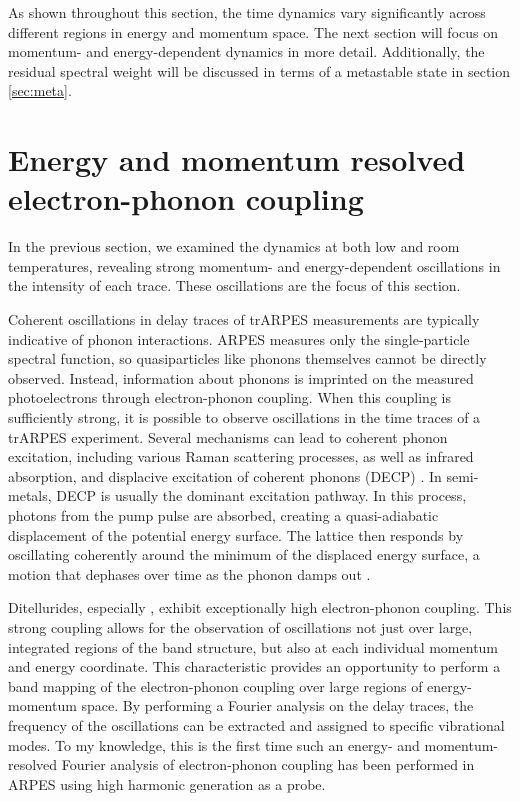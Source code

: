 As shown throughout this section, the time dynamics vary significantly across different regions in energy and momentum space.
The next section will focus on momentum- and energy-dependent dynamics in more detail.
Additionally, the residual spectral weight will be discussed in terms of a metastable state in section \ref{sec:meta}.

\section{Energy and momentum resolved electron-phonon coupling}
\label{sec:phonon_osc}

In the previous section, we examined the dynamics at both low and room temperatures, revealing strong momentum- and energy-dependent oscillations in the intensity of each trace.
These oscillations are the focus of this section.

Coherent oscillations in delay traces of trARPES measurements are typically indicative of phonon interactions.
ARPES measures only the single-particle spectral function, so quasiparticles like phonons themselves cannot be directly observed.
Instead, information about phonons is imprinted on the measured photoelectrons through electron-phonon coupling.
When this coupling is sufficiently strong, it is possible to observe oscillations in the time traces of a trARPES experiment.
Several mechanisms can lead to coherent phonon excitation, including various Raman scattering processes, as well as infrared absorption, and displacive excitation of coherent phonons (DECP) \cite{zeiger_theory_1992, kuznetsov_theory_1994, giret_entropy_2011, juraschek_sum-frequency_2018, lakehal_microscopic_2019, caruso_quantum_2023, emeis_coherent_2024}.
In semi-metals, DECP is usually the dominant excitation pathway.
In this process, photons from the pump pulse are absorbed, creating a quasi-adiabatic displacement of the potential energy surface.
The lattice then responds by oscillating coherently around the minimum of the displaced energy surface, a motion that dephases over time as the phonon damps out \cite{zeiger_theory_1992, kuznetsov_theory_1994, bothschafter_ultrafast_2013, emeis_coherent_2024}.

Ditellurides, especially , exhibit exceptionally high electron-phonon coupling.
This strong coupling allows for the observation of oscillations not just over large, integrated regions of the band structure, but also at each individual momentum and energy coordinate.
This characteristic provides an opportunity to perform a band mapping of the electron-phonon coupling over large regions of energy-momentum space.
By performing a Fourier analysis on the delay traces, the frequency of the oscillations can be extracted and assigned to specific vibrational modes.
To my knowledge, this is the first time such an energy- and momentum-resolved Fourier analysis of electron-phonon coupling has been performed in ARPES using high harmonic generation as a probe.

